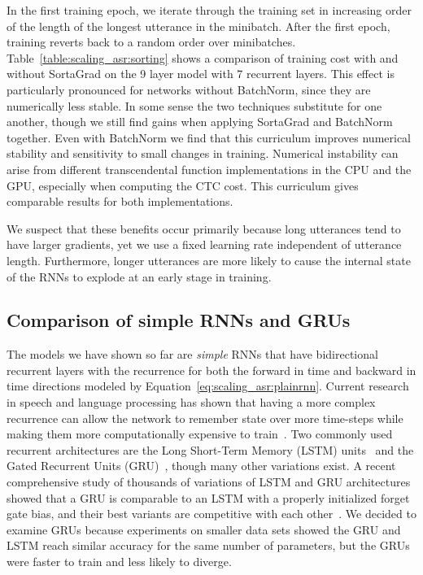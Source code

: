 In the first training epoch, we iterate through the training set in increasing
order of the length of the longest utterance in the minibatch. After the first
epoch, training reverts back to a random order over minibatches.
Table~\ref{table:scaling_asr:sorting} shows a comparison of training cost with
and without SortaGrad on the 9 layer model with 7 recurrent layers. This effect
is particularly pronounced for networks without BatchNorm, since they are
numerically less stable. In some sense the two techniques substitute for one
another, though we still find gains when applying SortaGrad and BatchNorm
together. Even with BatchNorm we find that this curriculum improves numerical
stability and sensitivity to small changes in training. Numerical instability
can arise from different transcendental function implementations in the CPU and
the GPU, especially when computing the CTC cost. This curriculum gives
comparable results for both implementations.

We suspect that these benefits occur primarily because long utterances tend to
have larger gradients, yet we use a fixed learning rate independent of
utterance length. Furthermore, longer utterances are more likely to cause the
internal state of the RNNs to explode at an early stage in training.

\subsection{Comparison of simple RNNs and GRUs}

The models we have shown so far are \emph{simple} RNNs that have bidirectional
recurrent layers with the recurrence for both the forward in time and backward
in time directions modeled by Equation~\ref{eq:scaling_asr:plainrnn}. Current
research in speech and language processing has shown that having a more complex
recurrence can allow the network to remember state over more time-steps while
making them more computationally expensive to train~\cite{sainath2015,
chan2016, sutskever2014, bahdanau2016}. Two commonly used recurrent
architectures are the Long Short-Term Memory (LSTM)
units~\cite{hochreiter1997} and the Gated Recurrent Units
(GRU)~\cite{cho2014}, though many other variations exist. A recent
comprehensive study of thousands of variations of LSTM and GRU architectures
showed that a GRU is comparable to an LSTM with a properly initialized forget
gate bias, and their best variants are competitive with each
other~\cite{jozefowicz2015}. We decided to examine GRUs because experiments on
smaller data sets showed the GRU and LSTM reach similar accuracy for the same
number of parameters, but the GRUs were faster to train and less likely to
diverge. 

